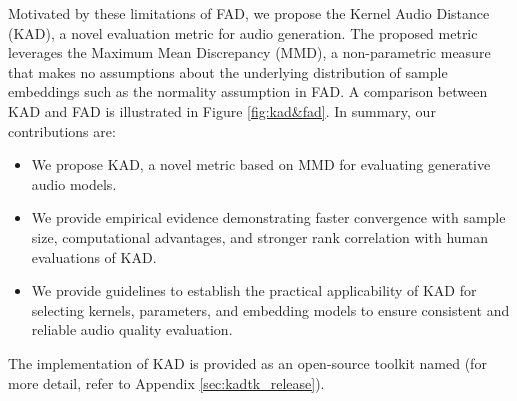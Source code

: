 Motivated by these limitations of FAD, we propose the Kernel Audio Distance (KAD), a novel evaluation metric for audio generation. The proposed metric leverages the Maximum Mean Discrepancy (MMD), a non-parametric measure that makes no assumptions about the underlying distribution of sample embeddings such as the normality assumption in FAD. A comparison between KAD and FAD is illustrated in Figure \ref{fig:kad&fad}.
In summary, our contributions are:
\begin{itemize}
    \item We propose KAD, a novel metric based on MMD for evaluating generative audio models.
    \item We provide empirical evidence demonstrating faster convergence with sample size, computational advantages, and stronger rank correlation with human evaluations of KAD.
    \item We provide guidelines to establish the practical applicability of KAD for selecting kernels, parameters, and embedding models to ensure consistent and reliable audio quality evaluation. 
\end{itemize}                      
The implementation of KAD is provided as an open-source toolkit named  (for more detail, refer to Appendix \ref{sec:kadtk_release}).


